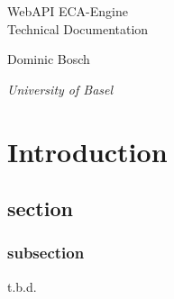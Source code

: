 \documentclass{article}
\newcommand*{\createTitlePage}{\begingroup
\centering
\vspace*{6\baselineskip}

{\Huge WebAPI ECA-Engine}\\[4\baselineskip]

{\LARGE Technical Documentation} \\[\baselineskip]

\vspace*{25\baselineskip}

{Dominic Bosch\par}
{\itshape University of Basel\par}




\endgroup}
\begin{document}
\clearpage\createTitlePage
\thispagestyle{empty}



\newpage
\tableofcontents
\newpage


\section{Introduction}
\subsection{section}
\subsubsection{subsection}
t.b.d.
\end{document}
